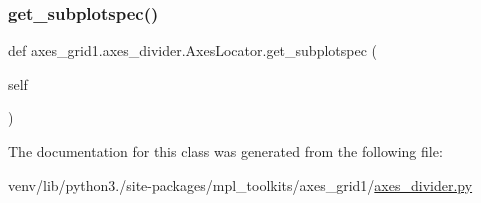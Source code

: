 \mbox{\label{classaxes__grid1_1_1axes__divider_1_1AxesLocator_a8a4e7a3a9aa76e65993c41b78a3b850b}} 
\subsubsection{\texorpdfstring{get\+\_\+subplotspec()}{get\_subplotspec()}}
{\footnotesize\ttfamily def axes\+\_\+grid1.\+axes\+\_\+divider.\+Axes\+Locator.\+get\+\_\+subplotspec (\begin{DoxyParamCaption}\item[{}]{self }\end{DoxyParamCaption})}



The documentation for this class was generated from the following file\+:\begin{DoxyCompactItemize}
\item 
venv/lib/python3./site-\/packages/mpl\+\_\+toolkits/axes\+\_\+grid1/\hyperlink{axes__grid1_2axes__divider_8py}{axes\+\_\+divider.\+py}\end{DoxyCompactItemize}
